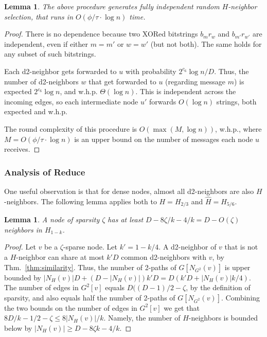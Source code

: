 \documentclass[12pt,a4]{article}
\newtheorem{lemma}[theorem]{Lemma}
\begin{document}
\begin{lemma}
The above procedure generates fully independent random $H$-neighbor selection, that runs in $O(\phi/\tau \cdot \log n)$ time.
\end{lemma}
\begin{proof}
There is no dependence because two XORed bitstrings $b_m r_w$ and $b_{m'} r_{w'}$ are independent, even if either $m=m'$ or $w=w'$ (but not both). The same holds for any subset of such bitstrings.

Each d2-neighbor gets forwarded to $u$ with probability $2^{c_6}\log n / D$. Thus, the number of d2-neighbors $w$ that get forwarded to $u$ (regarding message $m$) is expected $2^{c_6} \log n$, and w.h.p. $\Theta(\log n)$. This is independent across the incoming edges, so each intermediate node $u'$ forwards $O(\log n)$ strings, both expected and w.h.p.

The round complexity of this procedure is $O(\max(M,\log n))$, w.h.p., where $M = O(\phi/\tau \cdot \log n)$ is an upper bound on the number of messages each node $u$ receives.
\end{proof}


\subsubsection{Analysis of Reduce}

One useful observation is that for dense nodes, almost all d2-neighbors are also $H$-neighbors. The following lemma applies both to $H = H_{2/3}$ and $\hat{H} = H_{5/6}$.

\begin{lemma}
A node of sparsity $\zeta$ has at least $D - 8\zeta/k -4/k = D-O(\zeta)$ neighbors in $H_{1-k}$. 
\label{L:h-degree}
\end{lemma}
 
 \begin{proof}
 Let $v$ be a $\zeta$-sparse node.
Let $k' = 1 - k/4$.
A d2-neighbor of $v$ that is not a $H$-neighbor can share 
at most $k' D$ common d2-neighbors with $v$, by Thm.~\ref{thm:similarity}. 
Thus, the number of 2-paths of $G[N_{G^2}(v)]$ is upper bounded by $|N_H(v)| D + (D - |N_H(v)|) k' D = 
D(k' D + |N_H(v)| k/4)$.
The number of edges in $G^2[v]$ equals $D((D-1)/2 - \zeta$, by the definition of sparsity, and also equals
half the number of 2-paths of $G[N_{G^2}(v)]$. 
Combining the two bounds on the number of edges in $G^2[v]$ we get that $8D/k-1/2 -\zeta \le 8|N_H(v)|/k$. Namely, the number of $H$-neighbors is bounded below by $|N_H(v)| \ge D - 8\zeta k -4/k$.
\end{proof}
\end{document}
